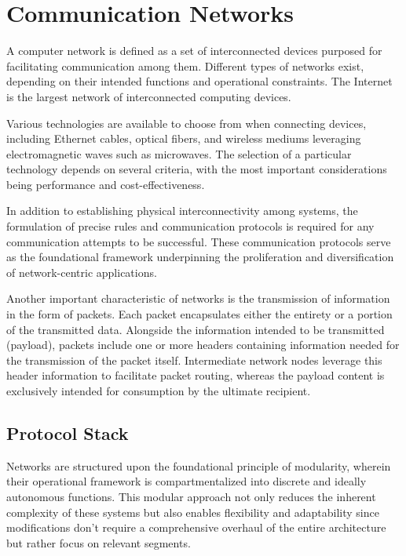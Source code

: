 \section{Communication Networks}
A computer network is defined as a set of interconnected devices purposed for facilitating communication among them.  Different types of networks exist, depending on their intended functions and operational constraints. The Internet is the largest network of interconnected computing devices.

Various technologies are available to choose from when connecting devices, including Ethernet cables, optical fibers, and wireless mediums leveraging electromagnetic waves such as microwaves. The selection of a particular technology depends on several criteria, with the most important considerations being performance and cost-effectiveness.

In addition to establishing physical interconnectivity among systems, the formulation of precise rules and communication protocols is required for any communication attempts to be successful. These communication protocols serve as the foundational framework underpinning the proliferation and diversification of network-centric applications.

Another important characteristic of networks is the transmission of information in the form of packets. Each packet encapsulates either the entirety or a portion of the transmitted data. Alongside the information intended to be transmitted (payload), packets include one or more headers containing information needed for the transmission of the packet itself. Intermediate network nodes leverage this header information to facilitate packet routing, whereas the payload content is exclusively intended for consumption by the ultimate recipient.


\subsection{Protocol Stack}

Networks are structured upon the foundational principle of modularity, wherein their operational framework is compartmentalized into discrete and ideally autonomous functions. This modular approach not only reduces the inherent complexity of these systems but also enables flexibility and adaptability since modifications don't require a comprehensive overhaul of the entire architecture but rather focus on relevant segments.

